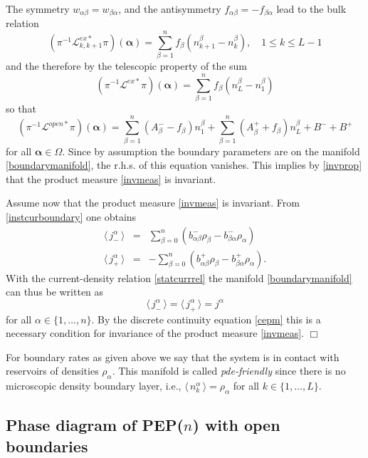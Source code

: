 \documentclass[12pt]{article}
\newcommand{\exval}[1]{\mbox{$\langle \, {#1}\, \rangle$}}
\newcommand{\balpha}{\boldsymbol{\alpha}}
\def\qed{\hfill$\Box$\par\medskip\par\relax}
\begin{document}
The symmetry $w_{\alpha\beta} = w_{\beta\alpha}$,
and the antisymmetry  $f_{\alpha\beta} = - f_{\beta\alpha}$ lead to the
bulk relation
\begin{equation}
(\pi^{-1} \mathcal{L}^{ex\ast}_{k,k+1} \pi) (\balpha) =
\sum_{\beta=1}^n f_\beta (n^{\beta}_{k+1} - n^{\beta}_{k} ),
\quad 1 \leq k \leq L-1 
\end{equation}
and the therefore by the telescopic property of the sum
\begin{equation}
(\pi^{-1} \mathcal{L}^{ex\ast} \pi) (\balpha) =
\sum_{\beta=1}^n f_\beta (n^{\beta}_{L} - n^{\beta}_{1} )
\end{equation}
so that
\begin{equation}
(\pi^{-1} \mathcal{L}^{open\ast} \pi) (\balpha) 
= \sum_{\beta=1}^n (A^{-}_\beta - f_\beta) n^{\beta}_{1} 
+ \sum_{\beta=1}^n (A^{+}_\beta + f_\beta) n^{\beta}_{L} 
+ B^{-} + B^{+}
\end{equation}
for all $\balpha \in \Omega$. Since by assumption
the boundary parameters  are on the manifold \eqref{boundarymanifold},
the r.h.s. of this equation vanishes. This implies by \eqref{invprop} that the product measure \eqref{invmeas} is invariant.

Assume now that the product measure \eqref{invmeas} is invariant.
From \eqref{instcurboundary} one obtains
\begin{eqnarray*}
\exval{j^\alpha_{-}} 
 & = & 
\sum_{\beta=0}^n (b_{\alpha\beta}^{-} \rho_{\beta} - b_{\beta\alpha}^{-} \rho_{\alpha}) \\
\exval{j^\alpha_{+}} 
 & = & -
\sum_{\beta=0}^n 
(b_{\alpha\beta}^{+} \rho_{\beta} - b_{\beta\alpha}^{+} \rho_{\alpha}).
\end{eqnarray*}
With the current-density
relation \eqref{statcurrrel} the manifold \eqref{boundarymanifold} 
can thus be written as
\begin{equation}
\exval{j^\alpha_-} = \exval{j^\alpha_+} = j^\alpha
\end{equation}
for all $\alpha \in \{1,\dots,n\}$. By the discrete continuity equation \eqref{cepm} this is
a necessary condition for invariance of the product measure \eqref{invmeas}.
\qed

For boundary rates as given
above we say that the system is in contact with reservoirs of
densities $\rho_{\alpha}$.
This manifold is called {\it pde-friendly} \cite{Popk04} since 
there is no microscopic density boundary layer, i.e., 
$\exval{n^\alpha_k} = \rho_\alpha$ for all $k\in\{1,\dots,L\}$.


\subsection{Phase diagram of PEP($n$) with open boundaries}
\end{document}
